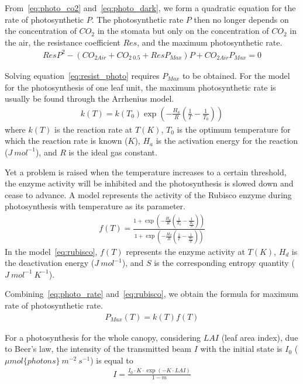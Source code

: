 \documentclass[a4paper]{article}
\numberwithin{equation}{section}
\begin{document}
From~\eqref{eq:photo_co2} and~\eqref{eq:photo_dark}, we form a quadratic equation for the rate of photosynthetic \(P\). The photosynthetic rate \(P\) then no longer depends on the concentration of \(CO_2\) in the stomata but only on the concentration of \(CO_2\) in the air, the resistance coefficient \(Res\), and the maximum photosynthetic rate.
\begin{align}
  \label{eq:resist_photo}
  ResP^2 - (CO_{2Air} + CO_{2\ 0.5} + ResP_{Max})P + CO_{2Air}P_{Max} = 0
\end{align}

Solving equation~\eqref{eq:resist_photo} requires \(P_{Max}\) to be obtained. For the model for the photosynthesis of one leaf unit, the maximum photosynthetic rate is usually be found through the Arrhenius model.
\begin{align}
  \label{eq:photo_rate}
  k(T) = k(T_0)\exp \left(-\frac{H_a}{R} \left(\frac{1}{T} - \frac{1}{T_0}\right)\right)
\end{align}
where \(k(T)\) is the reaction rate at \(T(K)\), \(T_0\) is the optimum temperature for which the reaction
rate is known (\(K\)), \(H_a\) is the activation energy for the reaction (\(J\ mol^{-1}\)), and \(R\) is the ideal gas constant.

Yet a problem is raised when the temperature increases to a certain threshold, the enzyme activity will be inhibited and the photosynthesis is slowed down and cease to advance. A model represents the activity of the Rubisco enzyme during photosynthesis with temperature as its parameter.
\begin{align}
  \label{eq:rubisco}
  f(T) = \frac{1 + \exp \left(-\frac{H_d}{R} \left(\frac{1}{T_0} - \frac{1}{\frac{H_d}{S}}\right)\right)}{1 + \exp \left(-\frac{H_d}{R}\left(\frac{1}{T} - \frac{1}{\frac{H_d}{S}}\right)\right)}
\end{align}
In the model~\eqref{eq:rubisco}, \(f(T)\) represents the enzyme activity at \(T(K)\), \(H_d\) is the deactivation energy (\(J\ mol^{-1}\)), and \(S\) is the corresponding entropy quantity (\(J\ mol^{-1}\ K^{-1}\)).

Combining~\eqref{eq:photo_rate} and~\eqref{eq:rubisco}, we obtain the formula for maximum rate of photosynthetic rate.
\begin{align}
  \label{eq:photo_max}
  P_{Max}(T) = k(T)f(T)
\end{align}

For a photosynthesis for the whole canopy, considering \(LAI\) (leaf area index), due to Beer's law, the intensity of the transmitted beam \(I\) with the initial state is \(I_0\) (\(\mu mol\{photons\}\ m^{-2}\ s^{-1}\)) is equal to
\begin{align}
  I = \frac{I_0 \cdot K \cdot \exp \left(-K \cdot LAI\right)}{1 - m}
\end{align}
\end{document}
